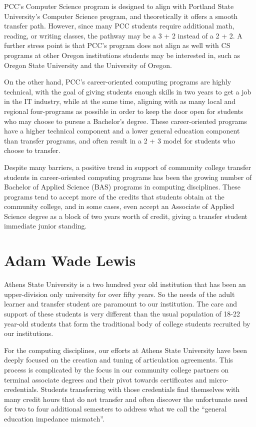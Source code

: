 \documentclass{article}
\begin{document}
PCC's Computer Science program is designed to align with Portland State
University's Computer Science program, and theoretically it offers a
smooth transfer path. However, since many PCC students require
additional math, reading, or writing classes, the pathway may be a 3 + 2
instead of a 2 + 2. A further stress point is that PCC's program does
not align as well with CS programs at other Oregon institutions students
may be interested in, such as Oregon State University and the University
of Oregon.

On the other hand, PCC's career-oriented computing programs are highly
technical, with the goal of giving students enough skills in two years
to get a job in the IT industry, while at the same time, aligning with
as many local and regional four-programs as possible in order to keep
the door open for students who may choose to pursue a Bachelor's
degree. These career-oriented programs have a higher technical component
and a lower general education component than transfer programs, and
often result in a 2 + 3 model for students who choose to transfer.

Despite many barriers, a positive trend in support of community college
transfer students in career-oriented computing programs has been the
growing number of Bachelor of Applied Science (BAS) programs in
computing disciplines. These programs tend to accept more of the credits
that students obtain at the community college, and in some cases, even
accept an Associate of Applied Science degree as a block of two years
worth of credit, giving a transfer student immediate junior standing.

\section{Adam Wade Lewis}
Athens State University is a two hundred year old institution that has
been an upper-division only university for over fifty years.
So the needs of the adult learner and transfer student are paramount to
our institution.   The care and support of these students is very
different than the usual population of 18-22 year-old students that form
the traditional body of college students recruited by our institutions.

For the computing disciplines, our efforts at Athens State University
have been deeply focused on the creation and tuning of articulation
agreements.  This process is complicated by the focus in our community
college partners on terminal associate degrees and their pivot towards
certificates and micro-credentials.  Students transferring with those
credentials find themselves with many credit hours that do not transfer
and often discover the unfortunate need for two to four additional
semesters to address what we call the ``general education impedance
mismatch''.
\end{document}

